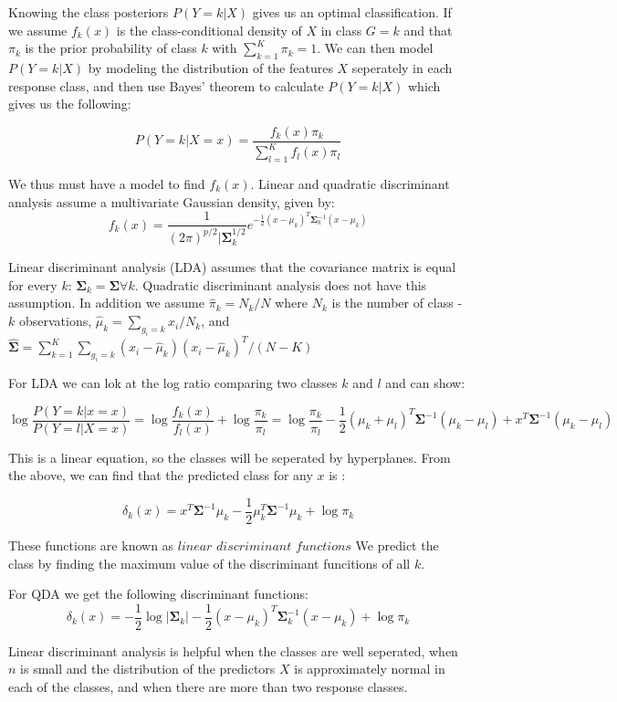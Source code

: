 \documentclass[12pt,twoside]{reedthesis}
\theoremstyle{definition}
\theoremstyle{definition}
\theoremstyle{definition}
\theoremstyle{remark}
\begin{document}
Knowing the class posteriors \(P(Y = k|X)\) gives us an optimal
classification. If we assume \(f_k(x)\) is the class-conditional density
of \(X\) in class \(G = k\) and that \(\pi_k\) is the prior probability
of class \(k\) with \(\sum_{k=1}^K \pi_k = 1\). We can then model
\(P(Y = k | X)\) by modeling the distribution of the features \(X\)
seperately in each response class, and then use Bayes' theorem to
calculate \(P(Y = k |X)\) which gives us the following:

\[ P(Y = k | X = x) = \frac{f_k(x)\pi_k}{\sum_{l = 1}^Kf_l(x)\pi_l}\]

We thus must have a model to find \(f_k(x)\). Linear and quadratic
discriminant analysis assume a multivariate Gaussian density, given by:
\[f_k(x) = \frac{1}{(2\pi)^{p/2}|\mathbf{\Sigma}_k^{1/2}}e^{-\frac{1}{2}(x-\mu_k)^T\mathbf{\Sigma}_k^{-1}(x - \mu_k)}\]

Linear discriminant analysis (LDA) assumes that the covariance matrix is
equal for every \(k\):
\(\mathbf{\Sigma}_k = \mathbf{\Sigma} \forall k\). Quadratic
discriminant analysis does not have this assumption. In addition we
assume \(\hat{\pi}_k = N_k/N\) where \(N_k\) is the number of class -
\(k\) observations, \(\hat{\mu}_k = \sum_{g_i = k}x_i/N_k\), and
\(\mathbf{\hat{\Sigma}} = \sum_{k = 1}^{K}\sum_{g_i = k}(x_i - \hat \mu_k)(x_i - \hat\mu_k)^T / (N- K)\)

For LDA we can lok at the log ratio comparing two classes \(k\) and
\(l\) and can show:

\[\log\frac{P(Y= k|x = x)}{P(Y = l|X = x)} = \log\frac{f_k(x)}{f_l(x)} + \log\frac{\pi_k}{\pi_l} = \log \frac{\pi_k}{\pi_l} - \frac{1}{2}(\mu_k + \mu_l)^T\mathbf{\Sigma}^{-1}(\mu_k- \mu_l) + x^T\mathbf{\Sigma}^{-1}(\mu_k - \mu_l) \]

This is a linear equation, so the classes will be seperated by
hyperplanes. From the above, we can find that the predicted class for
any \(x\) is :

\[ \delta_k(x) = x^T\mathbf{\Sigma}^{-1}\mu_k - \frac{1}{2}\mu_k^T\mathbf{\Sigma}^{-1}\mu_k + \log \pi_k \]

These functions are known as \(\textit{linear discriminant functions}\)
We predict the class by finding the maximum value of the discriminant
funcitions of all \(k\).

For QDA we get the following discriminant functions:
\[ \delta_k(x) = -\frac{1}{2}\log|\mathbf{\Sigma}_k| - \frac{1}{2}(x - \mu_k)^T\mathbf{\Sigma}_k^{-1}(x - \mu_k) + \log \pi_k \]

Linear discriminant analysis is helpful when the classes are well
seperated, when \(n\) is small and the distribution of the predictors
\(X\) is approximately normal in each of the classes, and when there are
more than two response classes.
\end{document}
